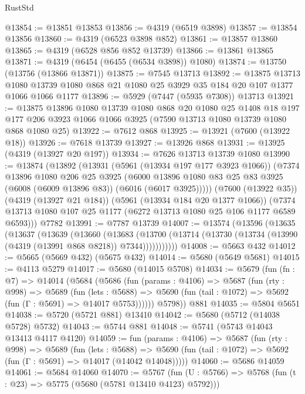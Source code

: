\begin{lexlean}{RustStd}
\begin{coremodule}
@13854 := @13851 @13853
@13856 := @4319 (@6519 @3898)
@13857 := @13854 @13856
@13860 := @4319 (@6523 @3898 @852)
@13861 := @13857 @13860
@13865 := @4319 (@6528 @856 @852 @13739)
@13866 := @13861 @13865
@13871 := @4319 (@6454 (@6455 (@6534 @3898)) @1080)
@13874 := @13750 (@13756 (@13866 @13871))
@13875 := @7545 @13713
@13892 := @13875
    @13713
    @1080
    @13739
    @1080
    @868
    @21
    @1080
    @25
    @3929
    @35
    @184
    @20
    @107
    @1377
    @1066
    @1066
    @1177
@13896 := @5929 (@7447 (@5935 @7308)) @13713
@13921 := @13875
    @13896
    @1080
    @13739
    @1080
    @868
    @20
    @1080
    @25
    @1408
    @18
    @197
    @177
    @206
    @3923
    @1066
    @1066
    @3925
    (@7590 @13713 @1080 @13739 @1080 @868 @1080 @25)
@13922 := @7612 @868
@13925 := @13921 (@7600 (@13922 @18))
@13926 := @7618 @13739
@13927 := @13926 @868
@13931 := @13925 (@4319 (@13927 @20 @197))
@13934 := @7626 @13713 @13739 @1080
@13990 := @13874
    (@13892
      (@13931
        (@5961 (@13934 @197 @177 @3923 @1066))
        (@7374
          @13896
          @1080
          @206
          @25
          @3925
          (@6000 @13896 @1080 @83 @25 @83 @3925 (@6008 (@6009 @13896 @83)) (@6016 (@6017 @3925)))))
      (@7600 (@13922 @35))
      (@4319 (@13927 @21 @184))
      (@5961 (@13934 @184 @20 @1377 @1066))
      (@7374 @13713 @1080 @107 @25 @1177 (@6272 @13713 @1080 @25 @106 @1177 @6589 @6593)))
    @7782
@13991 := @7787 @13739
@14007 := @13574
    (@13596
      (@13635
        (@13637
          (@13639
            (@13660
              (@13683
                (@13700 (@13714 (@13730 (@13734 (@13990 (@4319 (@13991 @868 @8218)) @7344)))))))))))
@14008 := @5663 @432
@14012 := @5665 (@5669 @432) (@5675 @432)
@14014 := @5680 (@5649 @5681)
@14015 := @4113 @5279
@14017 := @5680 (@14015 @5708)
@14034 := @5679
    (fun (fn : @7) =>
    @14014
      (@5684
        (@5686
          (fun (params : @4106) =>
          @5687
            (fun (rty : @998) =>
            @5689
              (fun (lets : @5688) =>
              @5690 (fun (tail : @1072) => @5692 (fun (Γ : @5691) => @14017 @5753))))))
        @5798))
    @881
@14035 := @5804 @5651
@14038 := @5720 (@5721 @881) @13410
@14042 := @5680 (@5712 (@14038 @5728) @5732)
@14043 := @5744 @881
@14048 := @5741 (@5743 @14043 @13413 @4117 @4120)
@14059 := fun (params : @4106) =>
  @5687
    (fun (rty : @998) =>
    @5689
      (fun (lets : @5688) =>
      @5690 (fun (tail : @1072) => @5692 (fun (Γ : @5691) => @14017 (@14042 @14048)))))
@14060 := @5686 @14059
@14061 := @5684 @14060
@14070 := @5767
    (fun (U : @5766) => @5768 (fun (t : @23) => @5775 (@5680 (@5781 @13410 @4123) @5792)))

\end{coremodule}
\end{lexlean}

